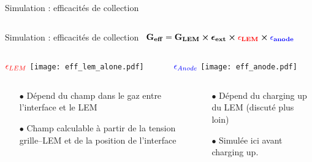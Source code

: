 \begin{frame}{Simulation : efficacités de collection}
\begin{scriptsize}
\begin{columns}
\begin{column}{0.65\textwidth}
	    		\end{column}
	    	\end{columns}
    	\end{scriptsize} 
    \end{frame}

    \begin{frame}{Simulation : efficacités de collection}
        \hbox{
     		$\mathbf{G_{eff}=G_{LEM}\boldsymbol{\times}\boldsymbol{\epsilon}_{ext} \boldsymbol{\times}\textcolor{red}{\epsilon_{LEM}}\boldsymbol{\times} \textcolor{blue}{\epsilon_{anode}}}$
     	}
   		\begin{columns}
            \begin{column}{0.5\textwidth}
                \centering $\textcolor{red}{\epsilon_{LEM}}$
                \texttt{[image: eff\_lem\_alone.pdf]}
            \end{column}\hfill
            \begin{column}{0.5\textwidth}
                \centering $\textcolor{blue}{\epsilon_{Anode}}$
                \texttt{[image: eff\_anode.pdf]}
            \end{column}
        \end{columns}
   		\begin{columns}
            \begin{column}{0.5\textwidth}
                \begin{scriptsize}
                    \begin{itemize}
                        \item[$\bullet$] Dépend du champ dans le gaz entre l'interface et le LEM
                        \item[$\bullet$] Champ calculable à partir de la tension grille--LEM et de la position de l'interface
                    \end{itemize}
                \end{scriptsize}
            \end{column}\hfill
            \begin{column}{0.5\textwidth}
                \begin{itemize}
                    \item[$\bullet$] Dépend du charging up du LEM (discuté plus loin)
                    \item[$\bullet$] Simulée ici avant charging up.
                \end{itemize}
            \end{column}
        \end{columns}
    \end{frame}
    
